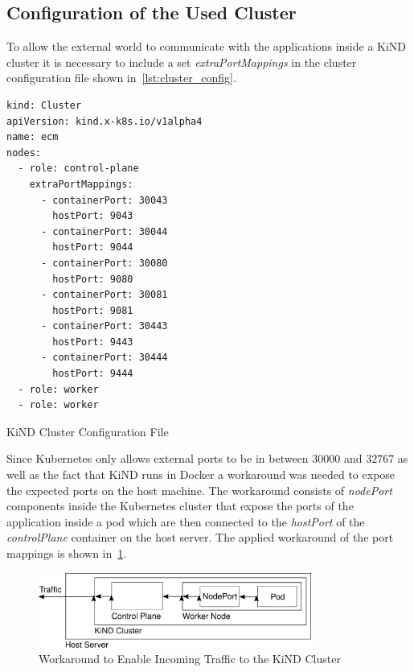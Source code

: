 \subsection{Configuration of the Used Cluster}
To allow the external world to communicate with the applications inside a KiND cluster it is necessary to include a set \textit{extraPortMappings} in the cluster configuration file shown in~\cref{lst:cluster_config}.
\begin{Listing}
\begin{lstlisting}
kind: Cluster
apiVersion: kind.x-k8s.io/v1alpha4
name: ecm
nodes:
  - role: control-plane
    extraPortMappings:
      - containerPort: 30043
        hostPort: 9043
      - containerPort: 30044
        hostPort: 9044
      - containerPort: 30080
        hostPort: 9080
      - containerPort: 30081
        hostPort: 9081
      - containerPort: 30443
        hostPort: 9443
      - containerPort: 30444
        hostPort: 9444
  - role: worker
  - role: worker
  \end{lstlisting}
  \caption{KiND Cluster Configuration File}
  \label{lst:cluster_config}
\end{Listing}
Since Kubernetes only allows external ports to be in between $30000$ and $32767$ as well as the fact that KiND runs in Docker a workaround was needed to expose the expected ports on the host machine.
The workaround consists of \textit{nodePort} components inside the Kubernetes cluster that expose the ports of the application inside a pod which are then connected to the \textit{hostPort} of the \textit{controlPlane} container on the host server.
The applied workaround of the port mappings is shown in~\cref{fig:port_mapping}.
\begin{figure}[h]
    \centering
    \includegraphics[width=0.8\textwidth]{graphics/port_mapping.svg}
    \caption{Workaround to Enable Incoming Traffic to the KiND Cluster}
    \label{fig:port_mapping}
\end{figure}

